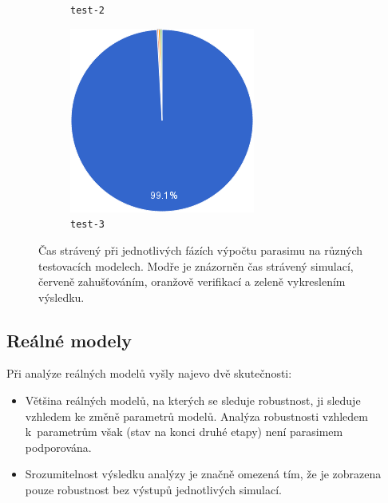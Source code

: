 \documentclass{parasim}
\begin{document}
\begin{figure}[h!]
\begin{subfigure}[b]{0.3\textwidth}
		\caption{\texttt{test-2}}
	\end{subfigure}
	\begin{subfigure}[b]{0.3\textwidth}
		\centering
		\includegraphics[width=\textwidth]{1.0.0.M2/test-3a.png}
		\caption{\texttt{test-3}}
	\end{subfigure}
	\caption{Čas strávený při jednotlivých fázích výpočtu parasimu na různých testovacích modelech.
	Modře je znázorněn čas strávený simulací, červeně zahušťováním, oranžově verifikací a zeleně vykreslením výsledku.}
	\label{fig:profiling}
\end{figure}

\subsection{Reálné modely}\label{sec:modely}
Při analýze reálných modelů vyšly najevo dvě skutečnosti:
\begin{itemize}
	\item	Většina reálných modelů, na kterých se sleduje robustnost, ji sleduje vzhledem ke změně parametrů modelů.
		Analýza robustnosti vzhledem k~parametrům však (stav na konci druhé etapy) není parasimem podporována.
	\item	Srozumitelnost výsledku analýzy je značně omezená tím, že je zobrazena pouze robustnost bez výstupů jednotlivých simulací.
\end{itemize}
\end{document}
